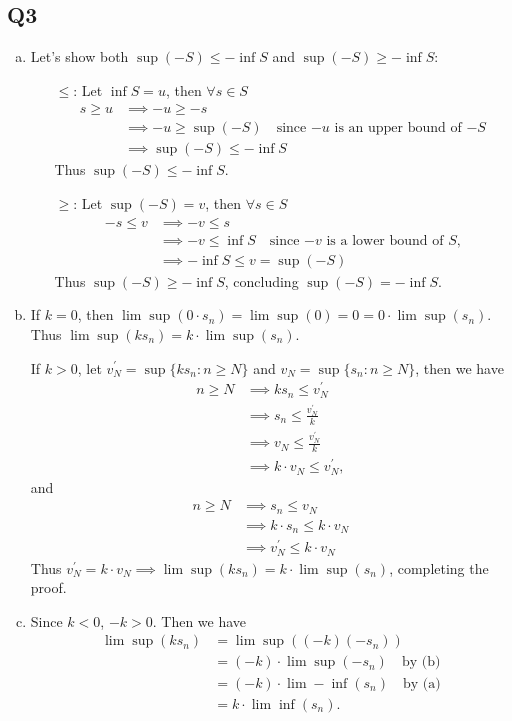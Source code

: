 \documentclass[12pt,lettersize]{article}
\theoremstyle{remark}
\begin{document}
	\subsection*{Q3}
	\begin{enumerate}[(a)]
		\item Let's show both $\sup(-S)\leq-\inf S$ and $\sup(-S)\geq-\inf S$:
		\begin{itemize}
			\item[$\leq$:] Let $\inf S=u$, then $\forall s\in S$
			\begin{align*}
				s\geq u &\implies -u\geq -s\\
						&\implies -u \geq \sup(-S)\quad\text{since $-u$ is an upper bound of $-S$}\\
						&\implies \sup(-S)\leq-\inf S
			\end{align*}
			Thus $\sup(-S)\leq-\inf S$.
			\item[$\geq$:] Let $\sup(-S)=v$, then $\forall s\in S$
			\begin{align*}
				-s\leq v &\implies -v\leq s\\
						 &\implies -v\leq\inf S\quad\text{since $-v$ is a lower bound of $S$,}\\
						 &\implies -\inf S\leq v=\sup(-S)
			\end{align*} 
			Thus $\sup(-S)\geq-\inf S$, concluding $\sup(-S)=-\inf S$.
		\end{itemize}
	
		\item If $k=0$, then $\lim\sup(0\cdot s_n)=\lim\sup(0)=0=0\cdot\lim\sup(s_n)$. Thus $\lim\sup(ks_n)=k\cdot\lim\sup(s_n)$.
		
		If $k>0$, let $v^\prime_N=\sup\{ks_n: n\geq N\}$ and $v_N=\sup\{s_n: n\geq N\}$, then we have
		\begin{align*}
			n\geq N &\implies ks_n\leq v^\prime_N\\
				&\implies s_n\leq\frac{v^\prime_N}{k}\\
				&\implies v_N\leq\frac{v^\prime_N}{k}\\
				&\implies k\cdot v_N\leq v^\prime_N,
		\end{align*}
		and 
		\begin{align*}
			n\geq N &\implies s_n\leq v_N\\
					&\implies k\cdot s_n\leq k\cdot v_N\\
					&\implies v_N^\prime\leq k\cdot v_N
		\end{align*}
		Thus $ v_N^\prime=k\cdot v_N\implies \lim\sup(ks_n)=k\cdot\lim\sup(s_n)$, completing the proof.
		
		\item Since $k<0$, $-k>0$. Then we have 
		\begin{align*}
			\lim\sup(ks_n) &= \lim\sup((-k)(-s_n))\\
						   &= (-k)\cdot\lim\sup(-s_n)\quad\text{by (b)}\\
						   &= (-k)\cdot\lim-\inf(s_n)\quad\text{by (a)}\\
						   &= k\cdot\lim\inf(s_n).
		\end{align*}
		
		
	\end{enumerate}
	\newpage
	
\end{document}

